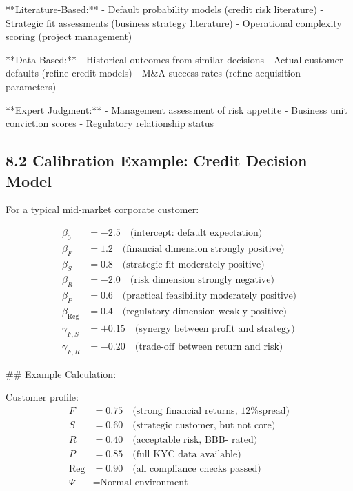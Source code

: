 \documentclass[11pt]{article}
\begin{document}
**Literature-Based:**
- Default probability models (credit risk literature)
- Strategic fit assessments (business strategy literature)
- Operational complexity scoring (project management)

**Data-Based:**
- Historical outcomes from similar decisions
- Actual customer defaults (refine credit models)
- M\&A success rates (refine acquisition parameters)

**Expert Judgment:**
- Management assessment of risk appetite
- Business unit conviction scores
- Regulatory relationship status

\subsection{8.2 Calibration Example: Credit Decision Model}

For a typical mid-market corporate customer:

\begin{align*}
\beta_0 &= -2.5 \quad \text{(intercept: default expectation)} \\
\beta_F &= 1.2 \quad \text{(financial dimension strongly positive)} \\
\beta_S &= 0.8 \quad \text{(strategic fit moderately positive)} \\
\beta_R &= -2.0 \quad \text{(risk dimension strongly negative)} \\
\beta_P &= 0.6 \quad \text{(practical feasibility moderately positive)} \\
\beta_{\text{Reg}} &= 0.4 \quad \text{(regulatory dimension weakly positive)} \\
\gamma_{F,S} &= +0.15 \quad \text{(synergy between profit and strategy)} \\
\gamma_{F,R} &= -0.20 \quad \text{(trade-off between return and risk)}
\end{align*}

## Example Calculation:

Customer profile:
\begin{align*}
F &= 0.75 \quad \text{(strong financial returns, 12\% spread)} \\
S &= 0.60 \quad \text{(strategic customer, but not core)} \\
R &= 0.40 \quad \text{(acceptable risk, BBB- rated)} \\
P &= 0.85 \quad \text{(full KYC data available)} \\
\text{Reg} &= 0.90 \quad \text{(all compliance checks passed)} \\
\Psi &= \text{Normal environment}
\end{align*}
\end{document}
